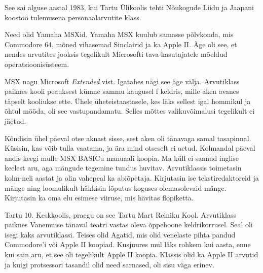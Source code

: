 
See sai alguse aastal 1983, kui Tartu 
Ülikoolis tehti Nõukogude Liidu ja Jaapani koostöö 
tulemusena personaalarvutite klass.


Need olid Yamaha MSXid. Yamaha MSX kuulub samasse põlvkonda, mis Commodore 64, mõned vihasemad Sinclairid ja 
ka Apple II. Äge oli see, et nendes arvutites jooksis 
tegelikult Microsofti tava-kasutajatele mõeldud operatsioonisüsteem.


MSX nagu Microsoft \emph{Extended} vist. Igatahes nägi see äge välja. Arvutiklass paiknes kooli peauksest kümne sammu kaugusel f
keldris, mille aken avanes täpselt kooliukse ette. Ühele üheteistaastasele, kes läks sellest igal hommikul ja õhtul mööda, 
oli see vastupandamatu. Selles mõttes valikuvõimalusi tegelikult 
ei jäetud. 


Kõndisin ühel päeval otse aknast sisse, sest 
aken oli tänavaga samal tasapinnal. Küsisin, kas võib tulla vaatama, ja ära mind otseselt ei aetud. Kolmandal päeval 
andis keegi mulle MSX BASICu 
manuaali koopia. Ma küll ei saanud 
inglise keelest aru, aga mängude tegemine tundus huvitav. 
Arvutiklassis toimetasin kolm-neli aastat ja olin vahepeal ka abiõpetaja. Kirjutasin ise tekstiredaktoreid ja mänge ning loomulikult häkkisin 
lõputus koguses olemasolevaid mänge. Kirjutasin ka oma elu esimese viiruse, mis hävitas flopiketta. 


Tartu 10. Keskkoolis, praegu on see
Tartu Mart Reiniku Kool. Arvutiklass paiknes Vanemuise tänaval teatri vastas 
oleva õppehoone keldrikorrusel. 
Seal oli isegi kaks arvutiklassi. Teises olid 
Agatid, mis olid venelaste pihta pandud 
Commodore'i või Apple II koopiad. Kusjuures mul läks rohkem kui aasta, enne kui sain aru, et see oli tegelikult 
Apple II koopia. Klassis olid ka Apple 
II arvutid ja kuigi protsessori tasandil olid need sarnased, 
oli sisu väga erinev. 

